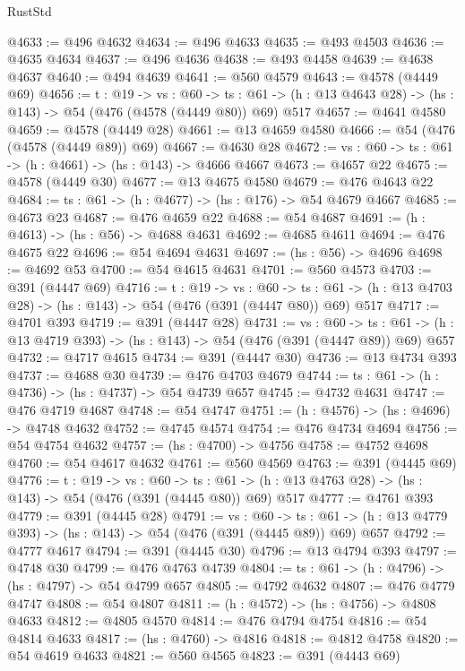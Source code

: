 \begin{lexlean}{RustStd}
\begin{coremodule}
@4633 := @496 @4632
@4634 := @496 @4633
@4635 := @493 @4503
@4636 := @4635 @4634
@4637 := @496 @4636
@4638 := @493 @4458
@4639 := @4638 @4637
@4640 := @494 @4639
@4641 := @560 @4579
@4643 := @4578 (@4449 @69)
@4656 := {t : @19} ->
  {vs : @60} ->
  {ts : @61} -> (h : @13 @4643 @28) -> (hs : @143) -> @54 (@476 (@4578 (@4449 @80)) @69) @517
@4657 := @4641 @4580
@4659 := @4578 (@4449 @28)
@4661 := @13 @4659 @4580
@4666 := @54 (@476 (@4578 (@4449 @89)) @69)
@4667 := @4630 @28
@4672 := {vs : @60} -> {ts : @61} -> (h : @4661) -> (hs : @143) -> @4666 @4667
@4673 := @4657 @22
@4675 := @4578 (@4449 @30)
@4677 := @13 @4675 @4580
@4679 := @476 @4643 @22
@4684 := {ts : @61} -> (h : @4677) -> (hs : @176) -> @54 @4679 @4667
@4685 := @4673 @23
@4687 := @476 @4659 @22
@4688 := @54 @4687
@4691 := (h : @4613) -> (hs : @56) -> @4688 @4631
@4692 := @4685 @4611
@4694 := @476 @4675 @22
@4696 := @54 @4694 @4631
@4697 := (hs : @56) -> @4696
@4698 := @4692 @53
@4700 := @54 @4615 @4631
@4701 := @560 @4573
@4703 := @391 (@4447 @69)
@4716 := {t : @19} ->
  {vs : @60} ->
  {ts : @61} -> (h : @13 @4703 @28) -> (hs : @143) -> @54 (@476 (@391 (@4447 @80)) @69) @517
@4717 := @4701 @393
@4719 := @391 (@4447 @28)
@4731 := {vs : @60} ->
  {ts : @61} -> (h : @13 @4719 @393) -> (hs : @143) -> @54 (@476 (@391 (@4447 @89)) @69) @657
@4732 := @4717 @4615
@4734 := @391 (@4447 @30)
@4736 := @13 @4734 @393
@4737 := @4688 @30
@4739 := @476 @4703 @4679
@4744 := {ts : @61} -> (h : @4736) -> (hs : @4737) -> @54 @4739 @657
@4745 := @4732 @4631
@4747 := @476 @4719 @4687
@4748 := @54 @4747
@4751 := (h : @4576) -> (hs : @4696) -> @4748 @4632
@4752 := @4745 @4574
@4754 := @476 @4734 @4694
@4756 := @54 @4754 @4632
@4757 := (hs : @4700) -> @4756
@4758 := @4752 @4698
@4760 := @54 @4617 @4632
@4761 := @560 @4569
@4763 := @391 (@4445 @69)
@4776 := {t : @19} ->
  {vs : @60} ->
  {ts : @61} -> (h : @13 @4763 @28) -> (hs : @143) -> @54 (@476 (@391 (@4445 @80)) @69) @517
@4777 := @4761 @393
@4779 := @391 (@4445 @28)
@4791 := {vs : @60} ->
  {ts : @61} -> (h : @13 @4779 @393) -> (hs : @143) -> @54 (@476 (@391 (@4445 @89)) @69) @657
@4792 := @4777 @4617
@4794 := @391 (@4445 @30)
@4796 := @13 @4794 @393
@4797 := @4748 @30
@4799 := @476 @4763 @4739
@4804 := {ts : @61} -> (h : @4796) -> (hs : @4797) -> @54 @4799 @657
@4805 := @4792 @4632
@4807 := @476 @4779 @4747
@4808 := @54 @4807
@4811 := (h : @4572) -> (hs : @4756) -> @4808 @4633
@4812 := @4805 @4570
@4814 := @476 @4794 @4754
@4816 := @54 @4814 @4633
@4817 := (hs : @4760) -> @4816
@4818 := @4812 @4758
@4820 := @54 @4619 @4633
@4821 := @560 @4565
@4823 := @391 (@4443 @69)

\end{coremodule}
\end{lexlean}
